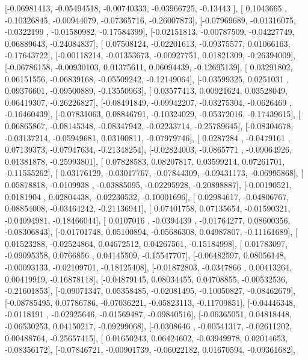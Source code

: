 \documentclass{article}
\begin{document}
       [-0.06981413, -0.05494518, -0.00740333, -0.03966725, -0.13443   ],
       [ 0.1043665 , -0.10326845, -0.00944079, -0.07365716, -0.26007873],
       [-0.07969689, -0.01316075, -0.0322199 , -0.01580982, -0.17584399],
       [-0.02151813, -0.00787509, -0.04227749,  0.06889643, -0.24084837],
       [ 0.07508124, -0.02201613, -0.09375577,  0.01066163, -0.17643722],
       [-0.00118214, -0.01353673, -0.00927751,  0.01821309, -0.26394009],
       [-0.06786158, -0.00930103,  0.01375611,  0.06094439, -0.12695139],
       [ 0.03291802,  0.06151556, -0.06839168, -0.05509242, -0.12149064],
       [-0.03599325,  0.0251031 ,  0.09376601, -0.09500889, -0.13550963],
       [ 0.03577413,  0.00921624,  0.03528049,  0.06419307, -0.26226827],
       [-0.08491849, -0.09942207, -0.03275304, -0.0626469 , -0.16460439],
       [-0.07831063,  0.08846791, -0.10324029, -0.05372016, -0.17439615],
       [ 0.06865867, -0.08145348, -0.08347942, -0.02233714, -0.25789645],
       [-0.08304678, -0.03137214, -0.05949681,  0.03100811, -0.07979746],
       [ 0.0287284 , -0.0479161 ,  0.07139373, -0.07947634, -0.21348254],
       [-0.02824003, -0.0865771 , -0.09064926,  0.01381878, -0.25993801],
       [ 0.07828583,  0.08207817,  0.03599214,  0.07261701, -0.11555262],
       [ 0.03176129, -0.03017767, -0.07844309, -0.09431173, -0.06995868],
       [ 0.05878818, -0.0109938 , -0.03885095, -0.02295928, -0.20898887],
       [-0.00190521,  0.0181904 ,  0.02804438, -0.02230532, -0.10001696],
       [ 0.02984617, -0.04806767,  0.08854008, -0.03464242, -0.21136941],
       [ 0.07401758,  0.07135654, -0.01590321, -0.04094981, -0.18466044],
       [ 0.0107016 , -0.0394439 , -0.01764277,  0.08600356, -0.08306843],
       [-0.01701748,  0.05100894, -0.05686308,  0.04987807, -0.11161689],
       [ 0.01523288, -0.02524864,  0.04672512,  0.04267561, -0.15184998],
       [ 0.01783097, -0.09095358,  0.0766856 ,  0.04145509, -0.15547707],
       [-0.06482597,  0.08056148, -0.00093133, -0.02109701, -0.18125408],
       [-0.01872803, -0.0347866 ,  0.00413264,  0.00419919, -0.16878118],
       [-0.04879145,  0.08034455,  0.04708855, -0.00532536, -0.21601853],
       [-0.09071347,  0.05358485, -0.02081495, -0.10050827, -0.08462679],
       [-0.08785495,  0.07786786, -0.07036221, -0.05823113, -0.11709851],
       [-0.04446348, -0.0118191 , -0.02925646, -0.01569487, -0.09840516],
       [-0.06365051,  0.04818448, -0.06530253,  0.04150217, -0.09299068],
       [-0.0308646 , -0.00541317, -0.02611202,  0.00488764, -0.25657415],
       [ 0.01650243,  0.06424602, -0.03949978,  0.02014653, -0.08356172],
       [-0.07846721, -0.00901739, -0.06022182,  0.01670594, -0.09361682],
\end{document}
